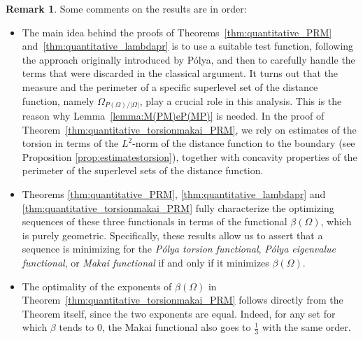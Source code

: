 \documentclass[oneside,a4paper,11pt,notitlepage]{article}
\theoremstyle{definition}
\theoremstyle{plain}
\theoremstyle{definition}
\newtheorem{oss}[esempio]{Remark}
\begin{document}
\begin{oss}\label{rem:betasharp} Some comments on the results are in order:
\begin{itemize}
    \item The main idea behind the proofs of Theorems~\ref{thm:quantitative_PRM} and~\ref{thm:quantitative_lambdapr} is to use a suitable test function, following the approach originally introduced by P\'olya, and then to carefully handle the terms that were discarded in the classical argument. It turns out that the measure and the perimeter of a specific superlevel set of the distance function, namely $\Omega_{P(\Omega)/|\Omega|}$, play a crucial role in this analysis. This is the reason why Lemma~\ref{lemma:M(PM)eP(MP)} is needed.
 In the proof of Theorem~\ref{thm:quantitative_torsionmakai_PRM}, we rely on estimates of the torsion in terms of the 
$L^2$-norm of the distance function to the boundary (see Proposition \ref{prop:estimatestorsion}), together with concavity properties of the perimeter of the superlevel sets of the distance function.
    \item Theorems \ref{thm:quantitative_PRM}, \ref{thm:quantitative_lambdapr} and \ref{thm:quantitative_torsionmakai_PRM}  fully characterize the optimizing sequences of these three functionals in terms of the functional $\beta(\Omega)$, which is purely geometric. Specifically, these results allow us to assert that a sequence is minimizing for the \emph{P\'olya torsion functional}, \emph{P\'olya eigenvalue functional}, or \emph{Makai functional} if and only if it minimizes $\beta(\Omega)$.

    \item The optimality of the exponents of $\beta(\Omega)$ in Theorem~\ref{thm:quantitative_torsionmakai_PRM}  follows directly from the Theorem itself, since the two exponents are equal. 
Indeed, for any set for which $\beta$ tends to $0$, the Makai functional also goes to $\frac{1}{3}$ with the same order.
\end{itemize}
\end{oss}
\end{document}
